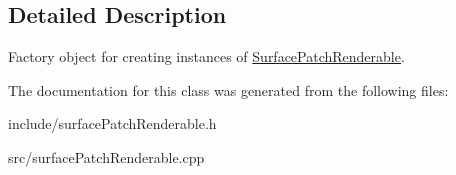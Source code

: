 \subsection{\-Detailed \-Description}
\-Factory object for creating instances of \hyperlink{classSurfacePatchRenderable}{\-Surface\-Patch\-Renderable}. 

\-The documentation for this class was generated from the following files\-:\begin{DoxyCompactItemize}
\item 
include/surface\-Patch\-Renderable.\-h\item 
src/surface\-Patch\-Renderable.\-cpp\end{DoxyCompactItemize}

